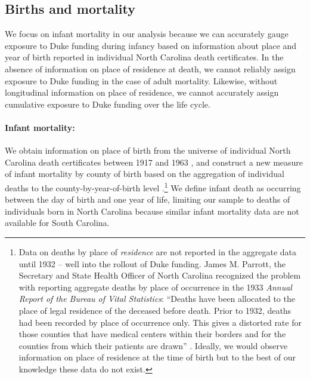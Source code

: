 \documentclass[12pt]{article}
\begin{document}
\subsection{Births and mortality} \label{subsec:nc-deaths}


We focus on infant mortality in our analysis because we can accurately gauge exposure to Duke funding during infancy based on information about place and year of birth reported in individual North Carolina death certificates. 
In the absence of information on place of residence at death, we cannot reliably assign exposure to Duke funding in the case of adult mortality. 
Likewise, without longitudinal information on place of residence, we cannot accurately assign cumulative exposure to Duke funding over the life cycle. 



\paragraph{Infant mortality:} 
We obtain information on place of birth from the universe of individual North Carolina death certificates between 1917 and 1963 , and construct a new measure of infant mortality by county of birth based on the aggregation of individual deaths to the county-by-year-of-birth level .\footnote{Data on deaths by place of \textit{residence} are not reported in the aggregate data until 1932 -- well into the rollout of Duke funding.
James M. Parrott, the Secretary and State Health Officer of North Carolina recognized the problem with reporting aggregate deaths by place of occurrence in the 1933 \textit{Annual Report of the Bureau of Vital Statistics}:
``Deaths have been allocated to the place of legal residence of the deceased before death. Prior to 1932, deaths had been recorded by place of occurrence only.
This gives a distorted rate for those counties that have medical centers within their borders and for the counties from which their patients are drawn'' .
Ideally, we would observe information on place of residence at the time of birth but to the best of our knowledge these data do not exist.
} 
We define infant death as occurring between the day of birth and one year of life, limiting our sample to deaths of individuals born in North Carolina because similar infant mortality data are not available for South Carolina.
\end{document}
